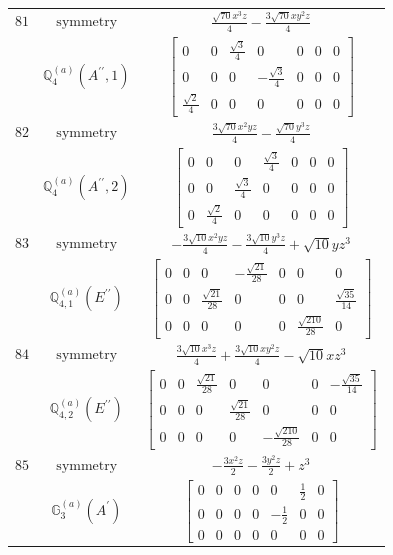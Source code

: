 \documentclass[fleqn,8pt,landscape]{jsarticle}
\begin{document}
\begin{longtable}{ccc}
$ 81 $ & $ \text{symmetry} $ & $ \frac{\sqrt{70} x^{3} z}{4} - \frac{3 \sqrt{70} x y^{2} z}{4} $ \\
$  $ & $ \mathbb{Q}_{4}^{(a)}(A^{\prime\prime},1) $ & $ \begin{bmatrix} 0 & 0 & \frac{\sqrt{3}}{4} & 0 & 0 & 0 & 0 \\ 0 & 0 & 0 & - \frac{\sqrt{3}}{4} & 0 & 0 & 0 \\ \frac{\sqrt{2}}{4} & 0 & 0 & 0 & 0 & 0 & 0 \end{bmatrix} $ \\ \hline
$ 82 $ & $ \text{symmetry} $ & $ \frac{3 \sqrt{70} x^{2} y z}{4} - \frac{\sqrt{70} y^{3} z}{4} $ \\
$  $ & $ \mathbb{Q}_{4}^{(a)}(A^{\prime\prime},2) $ & $ \begin{bmatrix} 0 & 0 & 0 & \frac{\sqrt{3}}{4} & 0 & 0 & 0 \\ 0 & 0 & \frac{\sqrt{3}}{4} & 0 & 0 & 0 & 0 \\ 0 & \frac{\sqrt{2}}{4} & 0 & 0 & 0 & 0 & 0 \end{bmatrix} $ \\ \hline
$ 83 $ & $ \text{symmetry} $ & $ - \frac{3 \sqrt{10} x^{2} y z}{4} - \frac{3 \sqrt{10} y^{3} z}{4} + \sqrt{10} y z^{3} $ \\
$  $ & $ \mathbb{Q}_{4,1}^{(a)}(E^{\prime\prime}) $ & $ \begin{bmatrix} 0 & 0 & 0 & - \frac{\sqrt{21}}{28} & 0 & 0 & 0 \\ 0 & 0 & \frac{\sqrt{21}}{28} & 0 & 0 & 0 & \frac{\sqrt{35}}{14} \\ 0 & 0 & 0 & 0 & 0 & \frac{\sqrt{210}}{28} & 0 \end{bmatrix} $ \\ \hline
$ 84 $ & $ \text{symmetry} $ & $ \frac{3 \sqrt{10} x^{3} z}{4} + \frac{3 \sqrt{10} x y^{2} z}{4} - \sqrt{10} x z^{3} $ \\
$  $ & $ \mathbb{Q}_{4,2}^{(a)}(E^{\prime\prime}) $ & $ \begin{bmatrix} 0 & 0 & \frac{\sqrt{21}}{28} & 0 & 0 & 0 & - \frac{\sqrt{35}}{14} \\ 0 & 0 & 0 & \frac{\sqrt{21}}{28} & 0 & 0 & 0 \\ 0 & 0 & 0 & 0 & - \frac{\sqrt{210}}{28} & 0 & 0 \end{bmatrix} $ \\ \hline
$ 85 $ & $ \text{symmetry} $ & $ - \frac{3 x^{2} z}{2} - \frac{3 y^{2} z}{2} + z^{3} $ \\
$  $ & $ \mathbb{G}_{3}^{(a)}(A^{\prime}) $ & $ \begin{bmatrix} 0 & 0 & 0 & 0 & 0 & \frac{1}{2} & 0 \\ 0 & 0 & 0 & 0 & - \frac{1}{2} & 0 & 0 \\ 0 & 0 & 0 & 0 & 0 & 0 & 0 \end{bmatrix} $ \\ \hline

\end{longtable}
\end{document}
